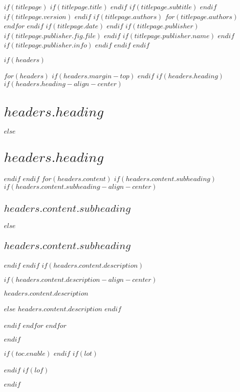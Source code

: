 \documentclass[$if(fontsize)$$fontsize$$else$10pt$endif$, $if(papersize)$$papersize$$else$a4paper$endif$, oneside]{book}
\begin{document}
$if(titlepage)$
$if(titlepage.title)$
$endif$
$if(titlepage.subtitle)$
$endif$
$if(titlepage.version)$
$endif$
$if(titlepage.authors)$
$for(titlepage.authors)$
$endfor$
$endif$
$if(titlepage.date)$
$endif$
$if(titlepage.publisher)$
$if(titlepage.publisher.fig.file)$
$endif$
$if(titlepage.publisher.name)$
$endif$
$if(titlepage.publisher.info)$
$endif$
$endif$
\setcounter{page}{2}
$endif$

$if(headers)$
{
\pagestyle{empty}
$for(headers)$
$if(headers.margin-top)$
\vspace*{$headers.margin-top$}
$endif$
$if(headers.heading)$
$if(headers.heading-align-center)$
\section*{\centering $headers.heading$}
$else$
\section*{$headers.heading$}
$endif$
$endif$
$for(headers.content)$
$if(headers.content.subheading)$
$if(headers.content.subheading-align-center)$
\subsection*{\centering $headers.content.subheading$}
$else$
\subsection*{$headers.content.subheading$}
$endif$
$endif$
$if(headers.content.description)$

$if(headers.content.description-align-center)$
{\centering $headers.content.description$ \par}
$else$
$headers.content.description$
$endif$


$endif$
$endfor$
\clearpage
$endfor$
}
$endif$

$if(toc.enable)$
\setcounter{tocdepth}{$if(toc.tocdepth)$$toc.tocdepth$$else$2$endif$}
{ \hypersetup{hidelinks} \tableofcontents } \clearpage
$endif$
$if(lot)$
{ \hypersetup{hidelinks} \listoftables } \clearpage
$endif$
$if(lof)$
{ \hypersetup{hidelinks} \listoffigures } \clearpage
$endif$
\end{document}
